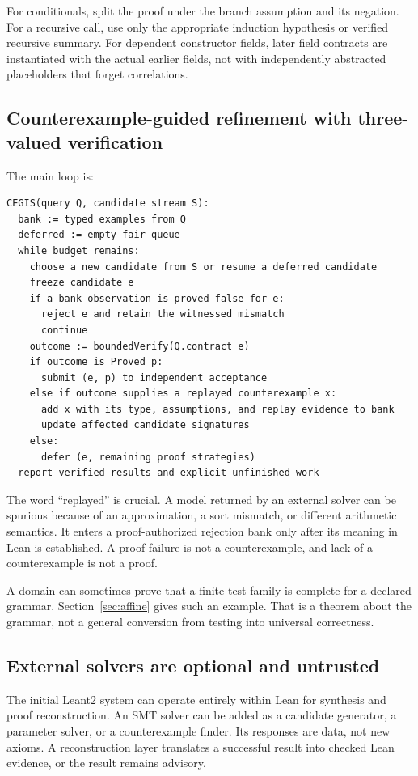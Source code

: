 For conditionals, split the proof under the branch assumption and its negation. For a recursive call, use only the appropriate induction hypothesis or verified recursive summary. For dependent constructor fields, later field contracts are instantiated with the actual earlier fields, not with independently abstracted placeholders that forget correlations.

\subsection{Counterexample-guided refinement with three-valued verification}
The main loop is:
\begin{lstlisting}
CEGIS(query Q, candidate stream S):
  bank := typed examples from Q
  deferred := empty fair queue
  while budget remains:
    choose a new candidate from S or resume a deferred candidate
    freeze candidate e
    if a bank observation is proved false for e:
      reject e and retain the witnessed mismatch
      continue
    outcome := boundedVerify(Q.contract e)
    if outcome is Proved p:
      submit (e, p) to independent acceptance
    else if outcome supplies a replayed counterexample x:
      add x with its type, assumptions, and replay evidence to bank
      update affected candidate signatures
    else:
      defer (e, remaining proof strategies)
  report verified results and explicit unfinished work
\end{lstlisting}
The word ``replayed'' is crucial. A model returned by an external solver can be spurious because of an approximation, a sort mismatch, or different arithmetic semantics. It enters a proof-authorized rejection bank only after its meaning in Lean is established. A proof failure is not a counterexample, and lack of a counterexample is not a proof.

A domain can sometimes prove that a finite test family is complete for a declared grammar. Section~\ref{sec:affine} gives such an example. That is a theorem about the grammar, not a general conversion from testing into universal correctness.

\subsection{External solvers are optional and untrusted}
The initial Leant2 system can operate entirely within Lean for synthesis and proof reconstruction. An SMT solver can be added as a candidate generator, a parameter solver, or a counterexample finder. Its responses are data, not new axioms. A reconstruction layer translates a successful result into checked Lean evidence, or the result remains advisory.

